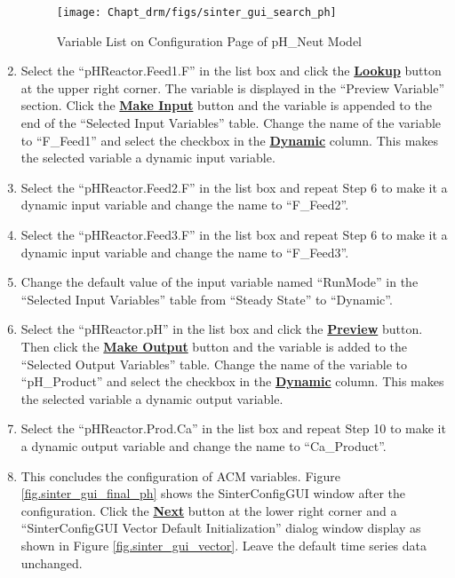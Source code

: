 \begin{enumerate}
	\begin{figure}[H]
		\begin{center}
			\texttt{[image: Chapt\_drm/figs/sinter\_gui\_search\_ph]}
			\caption{Variable List on Configuration Page of pH\_Neut Model}
			\label{fig.sinter_gui_search_ph}
		\end{center}
	\end{figure}
	\item Select the ``pHReactor.Feed1.F'' in the list box and click the \textbf{\underline{Lookup}} button at the upper right corner.  The variable is displayed in the ``Preview Variable'' section.  Click the \textbf{\underline{Make Input}} button and the variable is appended to the end of the ``Selected Input Variables'' table.  Change the name of the variable to ``F\_Feed1'' and select the checkbox in the \textbf{\underline{Dynamic}} column.  This makes the selected variable a dynamic input variable.
	\item Select the ``pHReactor.Feed2.F'' in the list box and repeat Step 6 to make it a dynamic input variable and change the name to ``F\_Feed2''.
	\item Select the ``pHReactor.Feed3.F'' in the list box and repeat Step 6 to make it a dynamic input variable and change the name to ``F\_Feed3''.
	\item Change the default value of the input variable named ``RunMode'' in the ``Selected Input Variables'' table from ``Steady State'' to ``Dynamic''.
	\item Select the ``pHReactor.pH'' in the list box and click the \textbf{\underline{Preview}} button.  Then click the \textbf{\underline{Make Output}} button and the variable is added to the ``Selected Output Variables'' table.  Change the name of the variable to ``pH\_Product'' and select the checkbox in the \textbf{\underline{Dynamic}} column.  This makes the selected variable a dynamic output variable.
	\item Select the ``pHReactor.Prod.Ca'' in the list box and repeat Step 10 to make it a dynamic output variable and change the name to ``Ca\_Product''.
	\item This concludes the configuration of ACM variables.  Figure \ref{fig.sinter_gui_final_ph} shows the SinterConfigGUI window after the configuration.  Click the \textbf{\underline{Next}} button at the lower right corner and a ``SinterConfigGUI Vector Default Initialization'' dialog window display as shown in Figure \ref{fig.sinter_gui_vector}.  Leave the default time series data unchanged.
	\begin{figure}[H]

\end{figure}
\end{enumerate}
